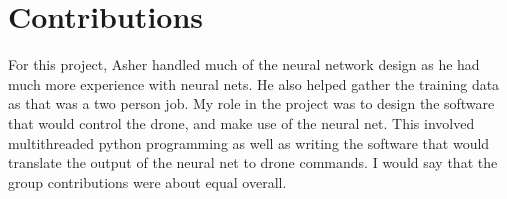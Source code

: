 \documentclass[12pt]{article}
\begin{document}
\section{Contributions} {
	For this project, Asher handled much of the neural network design as he had much more experience with neural nets. He also helped gather the training data as that was a two person job. My role in the project was to design the software that would control the drone, and make use of the neural net. This involved multithreaded python programming as well as writing the software that would translate the output of the neural net to drone commands. I would say that the group contributions were about equal overall.	
}
\end{document}
